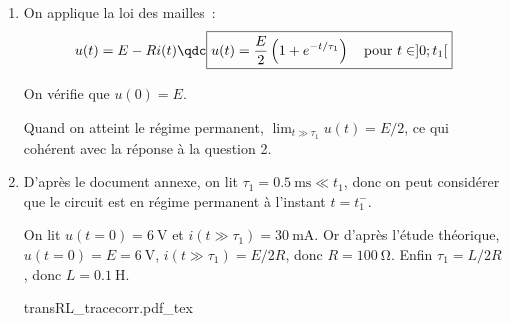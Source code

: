 \documentclass[a4paper, 10pt, garamond, oneside]{book}
\begin{document}
{\begin{enumerate}
		      Quand on atteint le régime permanent,
          $\lim_{t\gg \tau_1}i(t)= E/(2R)$, ce qui cohérent avec la réponse à
          la question 2.
		\item On applique la loi des mailles~:
		      \[
			      u(t)=E-Ri(t)
			      \qdc
			      \boxed{u(t)=\frac{E}{2}\left ( 1+e^{-t/\tau_1} \right )
            \quad\mbox{pour }
            t\in]0;t_1[}
		      \]

		      On vérifie que $u(0)=E$.

		      Quand on atteint le régime permanent, $\lim_{t\gg \tau_1}u(t)= E/2$, ce qui
		      cohérent avec la réponse à la question 2.
		\item
		      D'après le document annexe, on lit $\boxed{\tau_1=\SI{0,5}{\milli\second}\ll t_1}$, donc on peut considérer que le circuit est en régime permanent à l'instant $t=t_1^-$.

		      On lit $u(t=0)=\SI{6}{\volt}$ et $i(t\gg\tau_1)=\SI{30}{\milli\ampere}$. Or d'après l'étude théorique, $\boxed{u(t=0)=E=\SI{6}{\volt}}$, $i(t\gg\tau_1)=E/2R$, donc $\boxed{R=\SI{100}{\ohm}}$. Enfin $\tau_1=L/2R$, donc $\boxed{L=\SI{0,1}{\henry}}$.

		      \begin{center}
			      {transRL_tracecorr.pdf_tex}
		      \end{center}

	\end{enumerate}
}
\end{document}
